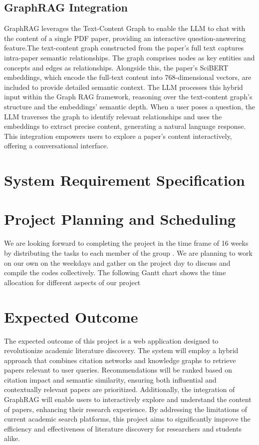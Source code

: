 \documentclass[a4paper,12pt]{article}
\begin{document}
\subsection{GraphRAG Integration}
GraphRAG leverages the Text-Content Graph to enable the LLM to chat with the content
of a single PDF paper, providing an interactive question-answering feature.The
text-content graph constructed from the paper’s full text captures intra-paper
semantic relationships. The graph comprises nodes as key entities and concepts
and edges as relationships. Alongside this, the paper’s SciBERT embeddings, which
encode the full-text content into 768-dimensional vectors, are included to provide
detailed semantic context. The LLM processes this hybrid input within the Graph RAG
framework, reasoning over the text-content graph’s structure and the embeddings’
semantic depth. When a user poses a question, the LLM traverses the graph to identify
relevant relationships and uses the embeddings to extract precise content, generating
a natural language response. This integration empowers users to explore a paper’s
content interactively, offering a conversational interface.
\newpage

\section{System Requirement Specification}
\newpage

\section{Project Planning and Scheduling}
We are looking forward to completing the project in the time frame of 16 weeks by
distributing the tasks to each member of the group . We are planning to work on our own
on the weekdays and gather on the project day to discuss and compile the codes
collectively. The following Gantt chart shows the time allocation for different aspects of
our project
\newpage

\section{Expected Outcome}
The expected outcome of this project is a web application designed to revolutionize
academic literature discovery. The system will employ a hybrid approach that combines
citation networks and knowledge graphs to retrieve papers relevant to user queries.
Recommendations will be ranked based on citation impact and semantic similarity,
ensuring both influential and contextually relevant papers are prioritized.
Additionally, the integration of GraphRAG will enable users to interactively
explore and understand the content of papers, enhancing their research experience.
By addressing the limitations of current academic search platforms, this project aims
to significantly improve the efficiency and effectiveness of literature discovery
for researchers and students alike.
\newpage

\printbibliography
\newpage
\end{document}
